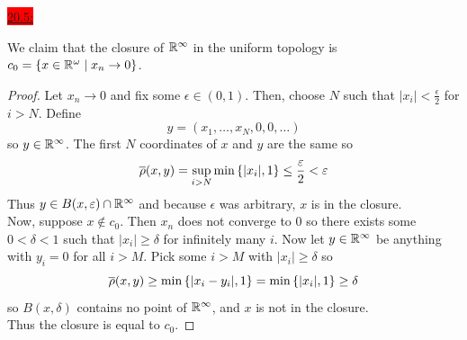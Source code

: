 \documentclass{exam}
\begin{document}
\colorbox{red}{\underline{20.5:}}
\begin{solution}
    We claim that the closure of $\mathbb R^{\infty}$ in the uniform topology is $c_0 = \left\{x \in \mathbb R^\omega \mid x_n \to 0 \right\}$.
    \begin{proof}
        Let $x_n \to 0$ and fix some $\epsilon \in (0, 1)$. Then, choose $N$ such that $|x_i| < \frac{\epsilon}{2}$ for $i > N$. Define 
        \[
            y = (x_1, \dots, x_{N}, 0, 0, \dots)
        \]
        so $y \in \mathbb R^\infty$. The first $N$ coordinates of $x$ and $y$ are the same so 
        \[
            \overline{\rho}(x, y) = \sup_{i > N}\min\left\{|x_i|, 1 \right\} \leq \frac{\varepsilon}{2} < \varepsilon
        \]
        Thus $y \in B(x, \varepsilon) \cap \mathbb R^\infty$ and because $\epsilon$ was arbitrary, $x$ is in the closure. \\
        Now, suppose $x \not\in c_0$. Then $x_n$ does not converge to $0$ so there exists some $0 < \delta < 1$ such that $|x_i| \geq \delta$ for infinitely many $i$. Now let $y \in \mathbb R^\infty$ be anything with $y_i = 0$ for all $i > M$. Pick some $i > M$ with $|x_i| \geq \delta$ so 
        \[
            \overline{\rho}(x, y) \geq \min\left\{|x_i - y_i|, 1 \right\} = \min\left\{|x_i|, 1 \right\} \geq \delta
        \]
        so $B(x, \delta)$ contains no point of $\mathbb R^\infty$, and $x$ is not in the closure. \\
        Thus the closure is equal to $c_0$.
    \end{proof}
\end{solution}
\end{document}
